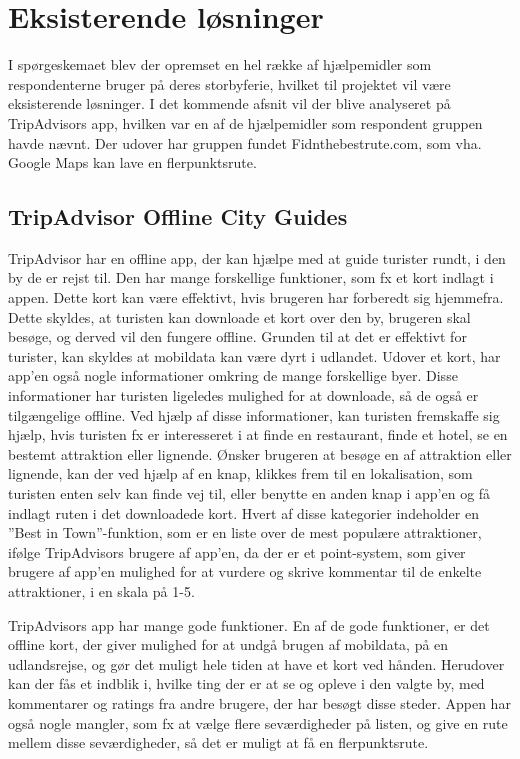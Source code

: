 \section{Eksisterende løsninger}
I spørgeskemaet blev der opremset en hel række af hjælpemidler som respondenterne bruger på deres storbyferie, hvilket til projektet vil være eksisterende løsninger. I det kommende afsnit vil der blive analyseret på TripAdvisors app, hvilken var en af de hjælpemidler som respondent gruppen havde nævnt. Der udover har gruppen fundet Fidnthebestrute.com, som vha. Google Maps kan lave en flerpunktsrute.  

\subsection{TripAdvisor Offline City Guides}
TripAdvisor har en offline app, der kan hjælpe med at guide turister rundt, i den by de er rejst til. Den har mange forskellige funktioner, som fx et kort indlagt i appen. Dette kort kan være effektivt, hvis brugeren har forberedt sig hjemmefra. Dette skyldes, at turisten kan downloade et kort over den by, brugeren skal besøge, og derved vil den fungere offline. Grunden til at det er effektivt for turister, kan skyldes at mobildata kan være dyrt i udlandet\citep {TDC}. \newline
Udover et kort, har app'en også nogle informationer omkring de mange forskellige byer. Disse informationer har turisten ligeledes mulighed for at downloade, så de også er tilgængelige offline. Ved hjælp af disse informationer, kan turisten fremskaffe sig hjælp, hvis turisten fx er interesseret i at finde en restaurant, finde et hotel, se en bestemt attraktion eller lignende. Ønsker brugeren at besøge en af attraktion eller lignende, kan der ved hjælp af en knap, klikkes frem til en lokalisation, som turisten enten selv kan finde vej til, eller benytte en anden knap i app'en og få indlagt ruten i det downloadede kort.\newline
Hvert af disse kategorier indeholder en ”Best in Town”-funktion, som er en liste over de mest populære attraktioner, ifølge TripAdvisors brugere af app'en, da der er et point-system, som giver brugere af app'en mulighed for at vurdere og skrive kommentar til de enkelte attraktioner, i en skala på 1-5. \newline

TripAdvisors app har mange gode funktioner. En af de gode funktioner, er det offline kort, der giver mulighed for at undgå brugen af mobildata, på en udlandsrejse, og gør det muligt hele tiden at have et kort ved hånden. Herudover kan der fås et indblik i, hvilke ting der er at se og opleve i den valgte by, med kommentarer og ratings fra andre brugere, der har besøgt disse steder.
Appen har også nogle mangler, som fx at vælge flere seværdigheder på listen, og give en rute mellem disse seværdigheder, så det er muligt at få en flerpunktsrute. \newline
